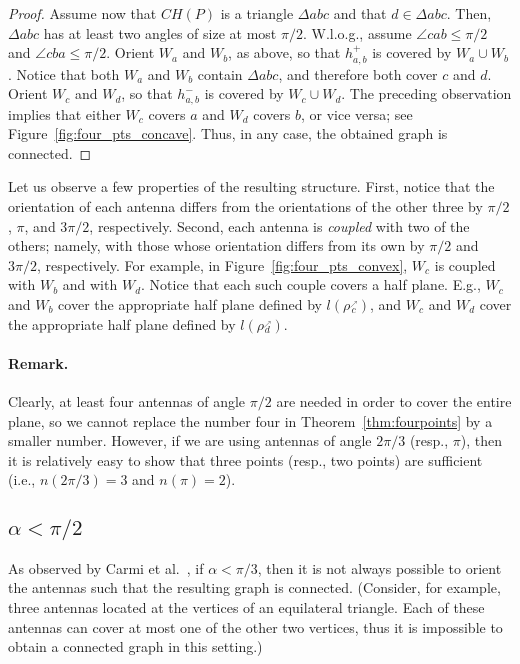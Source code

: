 \documentclass[11pt,letter]{article}
\def\wedge#1{{W_{{#1}}}}
\def\rightray#1{{\rho{\stackrel{_\nearrow}{_{#1}}}}}
\def\rightline#1{{l(\rightray{#1})}}
\begin{document}
\begin{proof}
Assume now that $CH(P)$ is a triangle $\Delta abc$ and that $d \in \Delta abc$. Then, $\Delta abc$ has at least
two angles of size at most $\pi/2$. W.l.o.g., assume $\angle cab \leq \pi/2$ and $\angle cba \leq \pi/2$.
Orient $\wedge{a}$ and $\wedge{b}$, as above, so that $h^+_{a,b}$ is covered by $\wedge{a} \cup \wedge{b}$.
Notice that both $\wedge{a}$ and $\wedge{b}$ contain $\Delta abc$, and therefore both cover $c$ and $d$.
Orient $\wedge{c}$ and $\wedge{d}$, so that $h^-_{a,b}$ is covered by $\wedge{c} \cup \wedge{d}$. The preceding observation implies that
either $\wedge{c}$ covers $a$ and $\wedge{d}$ covers $b$, or vice versa; see Figure~\ref{fig:four_pts_concave}.
Thus, in any case, the obtained graph is connected.

\end{proof}



Let us observe a few properties of the resulting structure.
First, notice that the orientation of each antenna differs from the orientations of the other three by $\pi/2$, $\pi$, and $3\pi/2$, respectively.
Second, each antenna is {\em coupled} with two of the others; namely, with those whose orientation differs from its own by $\pi/2$ and $3\pi/2$, respectively. For example, in Figure~\ref{fig:four_pts_convex}, $\wedge{c}$ is coupled with $\wedge{b}$ and with $\wedge{d}$.
Notice that each such couple covers a half plane. E.g., $\wedge{c}$ and $\wedge{b}$ cover the appropriate half plane defined by $\rightline{c}$, and $\wedge{c}$ and $\wedge{d}$ cover the appropriate half plane defined by $\rightline{d}$.


\paragraph{Remark.}
Clearly, at least four antennas of angle $\pi/2$ are needed in order to cover the entire plane, so we cannot replace the number four in Theorem~\ref{thm:fourpoints} by a smaller number. However, if we are using antennas of angle $2\pi/3$ (resp., $\pi$), then it is relatively easy to show that three points (resp., two points) are sufficient (i.e., $n(2\pi/3) = 3$ and $n(\pi) = 2$).


\subsection{$\alpha < \pi/2$}
As observed by Carmi et al.~\cite{CKLR09}, if $\alpha < \pi/3$,
then it is not always possible to orient the antennas such that the resulting graph is connected.
(Consider, for example, three antennas located at the vertices of an equilateral triangle.
Each of these antennas can cover at most one of the other two vertices, thus it is impossible to obtain a connected graph in this setting.)
\end{document}
